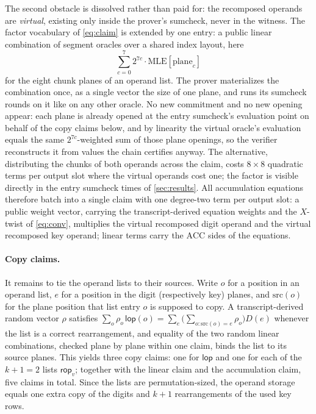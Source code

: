 \documentclass[11pt]{article}
\newcommand{\MLE}{\mathrm{MLE}}
\newcommand{\ACC}{\mathrm{ACC}}
\newcommand{\lop}{\mathsf{lop}}
\newcommand{\rop}{\mathsf{rop}}
\begin{document}
The second obstacle is dissolved rather than paid for: the recomposed operands are \emph{virtual}, existing only inside the prover's sumcheck, never in the witness. The factor vocabulary of \eqref{eq:claim} is extended by one entry: a public linear combination of segment oracles over a shared index layout, here
\[
  \textstyle\sum_{c=0}^{7} 2^{7c} \cdot \MLE[\text{plane}_c]
\]
for the eight chunk planes of an operand list. The prover materializes the combination once, as a single vector the size of one plane, and runs its sumcheck rounds on it like on any other oracle. No new commitment and no new opening appear: each plane is already opened at the entry sumcheck's evaluation point on behalf of the copy claims below, and by linearity the virtual oracle's evaluation equals the same $2^{7c}$-weighted sum of those plane openings, so the verifier reconstructs it from values the chain certifies anyway. The alternative, distributing the chunks of both operands across the claim, costs $8 \times 8$ quadratic terms per output slot where the virtual operands cost one; the factor is visible directly in the entry sumcheck times of \cref{sec:results}. All accumulation equations therefore batch into a single claim with one degree-two term per output slot: a public weight vector, carrying the transcript-derived equation weights and the $X$-twist of \eqref{eq:conv}, multiplies the virtual recomposed digit operand and the virtual recomposed key operand; linear terms carry the $\ACC$ sides of the equations.

\paragraph{Copy claims.} It remains to tie the operand lists to their sources. Write $o$ for a position in an operand list, $e$ for a position in the digit (respectively key) planes, and $\mathrm{src}(o)$ for the plane position that list entry $o$ is supposed to copy. A transcript-derived random vector $\rho$ satisfies $\sum_o \rho_o\, \lop(o) = \sum_e \bigl(\sum_{o : \mathrm{src}(o) = e} \rho_o\bigr) D(e)$ whenever the list is a correct rearrangement, and equality of the two random linear combinations, checked plane by plane within one claim, binds the list to its source planes. This yields three copy claims: one for $\lop$ and one for each of the $k + 1 = 2$ lists $\rop_v$; together with the linear claim and the accumulation claim, five claims in total. Since the lists are permutation-sized, the operand storage equals one extra copy of the digits and $k+1$ rearrangements of the used key rows.
\end{document}
